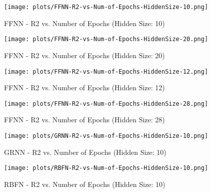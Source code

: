 \begin{figure}[H]
    \centering
    \texttt{[image: plots/FFNN-R2-vs-Num-of-Epochs-HiddenSize-10.png]}
    \caption{FFNN - R2 vs. Number of Epochs (Hidden Size: 10)}
\end{figure}

\begin{figure}[H]
    \centering
    \texttt{[image: plots/FFNN-R2-vs-Num-of-Epochs-HiddenSize-20.png]}
    \caption{FFNN - R2 vs. Number of Epochs (Hidden Size: 20)}
\end{figure}

\begin{figure}[H]
    \centering
    \texttt{[image: plots/FFNN-R2-vs-Num-of-Epochs-HiddenSize-12.png]}
    \caption{FFNN - R2 vs. Number of Epochs (Hidden Size: 12)}
\end{figure}

\begin{figure}[H]
    \centering
    \texttt{[image: plots/FFNN-R2-vs-Num-of-Epochs-HiddenSize-28.png]}
    \caption{FFNN - R2 vs. Number of Epochs (Hidden Size: 28)}
\end{figure}

\begin{figure}[H]
    \centering
    \texttt{[image: plots/GRNN-R2-vs-Num-of-Epochs-HiddenSize-10.png]}
    \caption{GRNN - R2 vs. Number of Epochs (Hidden Size: 10)}
\end{figure}

\begin{figure}[H]
    \centering
    \texttt{[image: plots/RBFN-R2-vs-Num-of-Epochs-HiddenSize-10.png]}
    \caption{RBFN - R2 vs. Number of Epochs (Hidden Size: 10)}
\end{figure}
